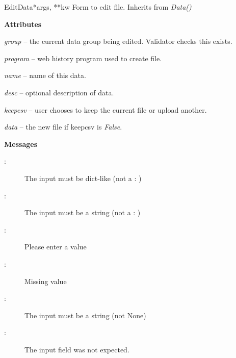 \documentclass[letterpaper,10pt,english]{manual}
\begin{document}
\hypertarget{webscavator.forms.forms.EditData}{}\begin{classdesc}{EditData}{*args, **kw}
Form to edit file. Inherits from \emph{Data()}

\textbf{Attributes}

\emph{group} -- the current data group being edited. Validator checks this exists.

\emph{program} -- web history program used to create file.

\emph{name} -- name of this data.

\emph{desc} -- optional description of data.

\emph{keepcsv} -- user chooses to keep the current file or upload another.

\emph{data} -- the new file if keepcsv is \emph{False}.

\textbf{Messages}
\begin{description}
\item[:]
The input must be dict-like (not a : )

\item[:]
The input must be a string (not a : )

\item[:]
Please enter a value

\item[:]
Missing value

\item[:]
The input must be a string (not None)

\item[:]
The input field  was not expected.

\end{description}
\end{classdesc}
\end{document}
